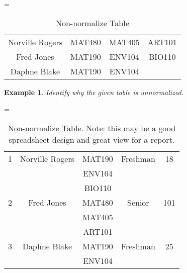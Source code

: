\documentclass{article}
\newtheorem{example}{Example}
\begin{document}
 
\begin{table}[h!]
\caption{Non-normalize Table}
\begin{center}

 = \begin{tabular}{|c|c|c|c|}
   \hline
   \cellcolor{excel}{Name}  &   \cellcolor{excel}{Class 1}
&  \cellcolor{excel}{Class 2} &  \cellcolor{excel}{Class 3} \\
  \hline
   Norville Rogers & MAT480  &   MAT405 & ART101 \\
      \hline
   Fred Jones & MAT190  &   ENV104 & BIO110 \\
 
      \hline 
  Daphne Blake & MAT190  &   ENV104 &    \\
        \hline 
\end{tabular}
\end{center}
\label{tab:unf1}
\end{table}%
% 
% 
% 







\begin{example}
  Identify why the given table is unnormalized. 
\end{example}


\begin{table}[h!]
\caption{Non-normalize Table.  Note: this may be a good spreadsheet design and great view for a report.  }
\begin{center}

 = \begin{tabular}{|c|c|c|c|c|}
   \hline
  \cellcolor{excel}{ID}  & \cellcolor{excel}{Name}  &   \cellcolor{excel}{Class}
&  \cellcolor{excel}{Rank} &  \cellcolor{excel}{Hours} \\
  \hline
  1 & Norville Rogers & MAT190  &   Freshman & 18 \\
      
    &  & ENV104  &  &   \\
      
    &   & BIO110  &  &   \\
      \hline
  2 & Fred Jones & MAT480  &   Senior & 101 \\ %
 
    &   & MAT405  &  &   \\
      
    &  & ART101  &   &  \\
   \hline
   3 & Daphne Blake & MAT190  &   Freshman & 25 \\

     &   &ENV104  &  &   \\
 
      \hline 
\end{tabular}
\end{center}
\label{tab:unf2}
\end{table}%
% 
% 
% 
\end{document}
